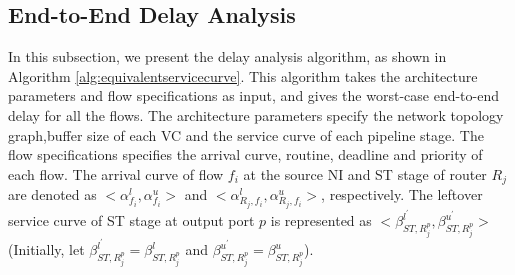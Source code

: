 \documentclass[preprint]{elsarticle}
\begin{document}
\subsection{End-to-End Delay Analysis}\label{e2elatency}
In this subsection, we present the delay analysis algorithm, as shown in Algorithm \ref{alg:equivalentservicecurve}. This algorithm takes the architecture parameters and flow specifications as input, and gives the worst-case end-to-end delay for all the flows. The architecture parameters specify the network topology graph,buffer size of each VC and the service curve of each pipeline stage. The flow specifications specifies the arrival curve, routine, deadline and priority of each flow. The arrival curve of flow $f_i$ at the source NI and ST stage of router $R_j$ are denoted as $<\alpha_{f_i}^l,\alpha_{f_i}^u>$ and $<\alpha_{R_j,f_i}^l,\alpha_{R_j,f_i}^u>$, respectively. The leftover service curve of ST stage at output port $p$ is represented as $<\beta_{ST,R_j^{p}}^{l^\prime},\beta_{ST,R_j^{p}}^{u^\prime}>$ (Initially, let $\beta_{ST,R_j^{p}}^{l^\prime}=\beta_{ST,R_j^{p}}^{l}$ and $\beta_{ST,R_j^{p}}^{u^\prime}=\beta_{ST,R_j^{p}}^{u}$).
\end{document}
